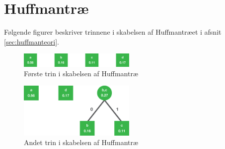 \chapter{Huffmantræ} \label{chapter:appendiks}
Følgende figurer beskriver trinnene i skabelsen af Huffmantræet i afsnit \vref{sec:huffmanteori}.
\begin{figure}[!h]
\centering
\includegraphics[width=0.5\textwidth]{Billeder/Huffman-tree-ex-01.png}
\caption{Første trin i skabelsen af Huffmantræ}
\label{fig:huffmantrae_ex1}
\end{figure}
\hfill
\begin{figure}[!h]
\centering
\includegraphics[width=0.5\textwidth]{Billeder/Huffman-tree-ex-02.png}
\caption{Andet trin i skabelsen af Huffmantræ}
\label{fig:huffmantrae_ex2}
\end{figure}
